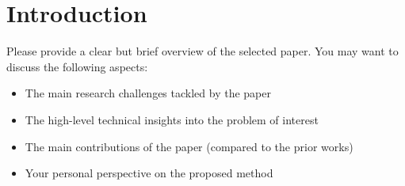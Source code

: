 \section{Introduction}
\label{section:intro}
Please provide a clear but brief overview of the selected paper. You may want to discuss the following aspects:
\begin{itemize}
    \item The main research challenges tackled by the paper
    \item The high-level technical insights into the problem of interest
    \item The main contributions of the paper (compared to the prior works)
    \item Your personal perspective on the proposed method
\end{itemize}